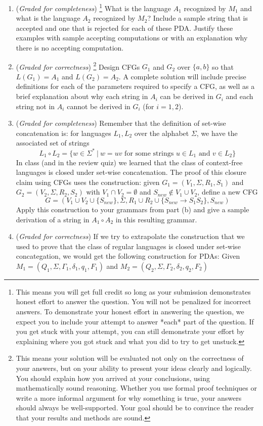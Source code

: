 \documentclass[12pt, oneside]{article}
\newcommand{\gradeCorrect}{({\it Graded for correctness}) }
\newcommand{\gradeCorrectFirst}{\gradeCorrect\footnote{This means your solution 
will be evaluated not only on the correctness of your answers, but on your ability
to present your ideas clearly and logically. You should explain how you 
arrived at your conclusions, using
mathematically sound reasoning. Whether you use formal proof techniques or 
write a more informal argument
for why something is true, your answers should always be well-supported. 
Your goal should be to convince the
reader that your results and methods are sound.} }
\newcommand{\gradeComplete}{({\it Graded for completeness}) }
\newcommand{\gradeCompleteFirst}{\gradeComplete\footnote{This means you will 
get full credit so long as your submission demonstrates honest effort to 
answer the question. You will not be penalized for incorrect answers. 
To demonstrate your honest effort in answering the question, we 
expect you to include your attempt to answer *each* part of the question. 
If you get stuck with your attempt, you can still demonstrate 
your effort by explaining where you got stuck and what 
you did to try to get unstuck.} }
\begin{document}
\begin{enumerate}[wide, labelwidth=!, labelindent=0pt]
\begin{center}
\begin{multicols}{2}
\end{multicols}
\end{center}
\begin{enumerate}
    \item \gradeCompleteFirst What is the language $A_1$ recognized by $M_1$ and what is the language $A_2$ recognized by $M_2$?
    Include a sample string that is accepted and one that is rejected for each of these PDA. Justify these examples
    with sample accepting computations or with an explanation why there is no accepting computation.
    \item \gradeCorrectFirst Design CFGs $G_1$ and $G_2$ over $\{a,b\}$ so that $L(G_1) = A_1$ and $L(G_2) = A_2$. A complete 
    solution will include precise definitions for each of the parameters required to specify a CFG, as well as a brief 
    explanation about why each string in $A_i$ can be derived in $G_i$ and each string not in $A_i$ cannot be derived in $G_i$ 
    (for $i=1,2$).
    \item \gradeComplete Remember that the definition of set-wise concatenation is:
    for languages $L_1, L_2$ over the alphabet $\Sigma$, we have the 
    associated set of strings
    \[
       L_1 \circ L_2 = \{ w \in \Sigma^* ~|~ w = uv \text{ for some strings } u \in L_1 \text{ and } v \in L_2 \}
    \]
    In class (and in the review quiz) we learned that the class of context-free languages is closed under set-wise concatenation.
    The proof of this closure claim using CFGs uses the construction: given $G_1 = ( V_1, \Sigma, R_1, S_1)$ and 
    $G_2 = (V_2, \Sigma, R_2, S_2)$ with $V_1 \cap V_2 = \emptyset$ and $S_{new} \notin V_1 \cup V_2$, define a new CFG
    $$G = (V_1 \cup V_2 \cup \{S_{new}\}, \Sigma, R_1 \cup R_2 \cup \{S_{new} \to S_1 S_2\}, S_{new})$$
    Apply this construction to your grammars from part (b) and give a sample derivation of a string in $A_1 \circ A_2$
    in this resulting grammar.
    \item \gradeCorrect If we try to extrapolate the construction that we used to prove that the class of regular languages
    is closed under set-wise concategation, we would get the following construction for PDAs: Given 
    $M_1 = (Q_1, \Sigma, \Gamma_1, \delta_1, q_1, F_1)$ and $M_2 = (Q_2, \Sigma, \Gamma_2, \delta_2, q_2, F_2)$

\end{enumerate}
\end{enumerate}
\end{document}
